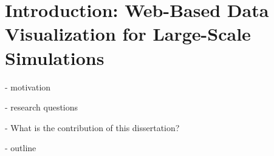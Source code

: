\hypertarget{introduction-main}{%
\section{Introduction: Web-Based Data Visualization for Large-Scale Simulations}
\label{introduction-main}}

- motivation

- research questions

- What is the contribution of this dissertation?

- outline


